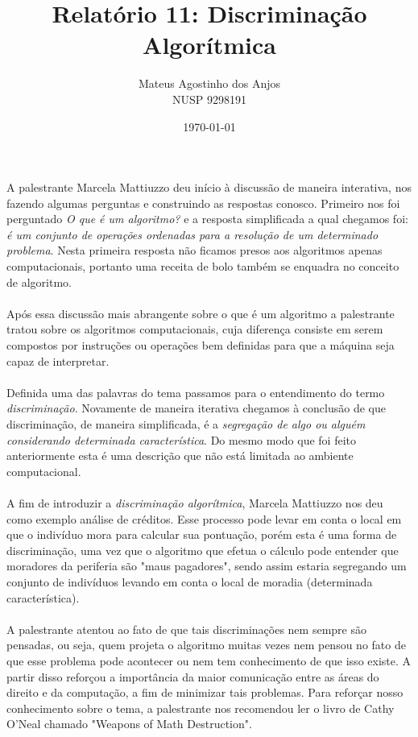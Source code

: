 \documentclass[12pt]{article}
\title{Relatório 11: Discriminação Algorítmica}
\author{Mateus Agostinho dos Anjos\\NUSP 9298191}
\date{\today}
\begin{document}
	\maketitle
	\paragraph{}
		A palestrante Marcela Mattiuzzo deu início à discussão de maneira 
		interativa, nos fazendo algumas perguntas e construindo as respostas
		conosco. Primeiro nos foi perguntado \textit{O que é um algoritmo?}
		e a resposta simplificada a qual chegamos foi: \textit{é um conjunto de
		operações ordenadas para a resolução de um determinado problema}.
		Nesta primeira resposta não ficamos presos aos algoritmos apenas
		computacionais, portanto uma receita de bolo também se enquadra no
		conceito de algoritmo.
	\paragraph{}
		Após essa discussão mais abrangente sobre o que é um algoritmo a
		palestrante tratou sobre os algoritmos computacionais, cuja diferença
		consiste em serem compostos por instruções ou operações bem definidas 
		para que a máquina seja capaz de interpretar.
	\paragraph{}
		Definida uma das palavras do tema passamos para o entendimento do
		termo \textit{discriminação}. Novamente de maneira iterativa chegamos
		à conclusão de que discriminação, de maneira simplificada, é a
		\textit{segregação de algo ou alguém considerando determinada 
		característica}. Do mesmo modo que foi feito anteriormente esta é
		uma descrição que não está limitada ao ambiente computacional.
	 \paragraph{}
	 	A fim de introduzir a 	\textit{discriminação algorítmica}, Marcela Mattiuzzo
	 	nos deu como exemplo análise de créditos. Esse processo pode levar em
	 	conta o local em que o indivíduo mora para calcular sua pontuação, porém
	 	esta é uma forma de discriminação, uma vez que o algoritmo que efetua
	 	o cálculo pode entender que moradores da periferia são "maus pagadores",
	 	sendo assim estaria segregando um conjunto de indivíduos levando em 
	 	conta o local de moradia (determinada característica). 
	\paragraph{}
		A palestrante atentou ao fato de que tais discriminações nem sempre são
		pensadas, ou seja, quem projeta o algoritmo muitas vezes nem pensou
		no fato de que esse problema pode acontecer ou nem tem conhecimento
		de que isso existe. A partir disso reforçou a importância da maior
		comunicação entre as áreas do direito e da computação, a fim de
		minimizar tais problemas. Para reforçar nosso conhecimento sobre
		o tema, a palestrante nos recomendou ler o livro de Cathy O'Neal
		chamado "Weapons of Math Destruction".
\end{document}
